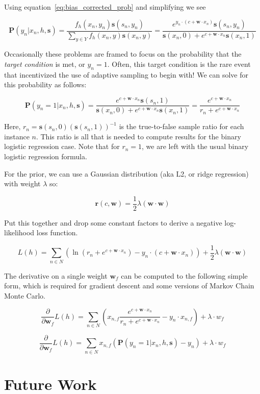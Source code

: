 \documentclass[twoside]{article}
\begin{document}
Using  equation~\eqref{eq:bias_corrected_prob} and simplifying we see

\[\mathbf{P}(y_n|x_n,h,\mathbf{s})=\frac{f_h(x_n,y_n)\mathbf{s}(s_n,y_n)}{\sum_{y \in Y}f_h(x_n,y)\mathbf{s}(x_n,y)}=\frac{e^{y_n \cdot (c+\mathbf{w} \cdot x_n)}\mathbf{s}(s_n,y_n)}{\mathbf{s}(x_n,0)+e^{c+\mathbf{w} \cdot x_n}\mathbf{s}(x_n,1)} \]

Occasionally these problems are framed to focus on the probability that the \textit{target condition} is met, or \(y_n = 1\). Often, this target condition is the rare event that incentivized the use of adaptive sampling to begin with! We can solve for this probability as follows:

\[\mathbf{P}(y_n=1|x_n,h,\mathbf{s})=\frac{e^{c+\mathbf{w} \cdot x_n}\mathbf{s}(s_n,1)}{\mathbf{s}(x_n,0)+e^{c+\mathbf{w} \cdot x_n}\mathbf{s}(x_n,1)}=\frac{e^{c+\mathbf{w} \cdot x_n}}{r_n+e^{c+\mathbf{w} \cdot x_n}} \]

Here, \(r_n = \mathbf{s}(s_n,0)(\mathbf{s}(s_n,1))^{-1}\) is the true-to-false sample ratio for each instance \(n\). This ratio is all that is needed to compute results for the binary logistic regression case. Note that for \(r_n=1\), we are left with the usual binary logistic regression formula.

For the prior, we can use a Gaussian distribution (aka L2, or ridge regression) with weight \(\lambda\) so:

\[\mathbf{r}(c,\mathbf{w})=\frac{1}{2}\lambda(\mathbf{w} \cdot \mathbf{w})\]

Put this together and drop some constant factors to derive a negative log-likelihood loss function.

\[L(h)=\sum_{n \in  N} \left (\ln\left (r_n+e^{c+\mathbf{w} \cdot x_n}\right ) -y_n \cdot (c+\mathbf{w} \cdot x_n) \right )+ \frac{1}{2}\lambda(\mathbf{w} \cdot \mathbf{w})\]

The derivative on a single weight \(\mathbf{w}_f\) can be computed to the following simple form, which is required for gradient descent and some versions of Markov Chain Monte Carlo.

\[\frac{\partial}{\partial \mathbf{w}_f }L(h)=\sum_{n \in  N} \left(x_{n,f}\frac{e^{c+\mathbf{w} \cdot x_n}}{r_n+e^{c+\mathbf{w} \cdot x_n}} -y_n \cdot x_{n,f} \right )+ \lambda \cdot w_f\] 

\[\frac{\partial}{\partial \mathbf{w}_f }L(h)= \sum_{n \in  N} x_{n,f}\left(\mathbf{P}(y_n=1|x_n,h,\mathbf{s}) -y_n  \right )+ \lambda \cdot w_f \]

\section{Future Work}
\end{document}
